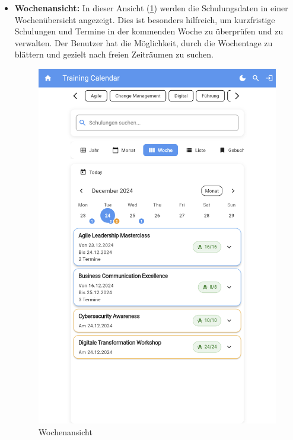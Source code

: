 \begin{itemize}
    \item \textbf{Wochenansicht:} In dieser Ansicht (\ref{Woche}) werden die Schulungsdaten in einer Wochenübersicht angezeigt. Dies ist besonders hilfreich, um kurzfristige Schulungen und Termine in der kommenden Woche zu überprüfen und zu verwalten. Der Benutzer hat die Möglichkeit, durch die Wochentage zu blättern und gezielt nach freien Zeiträumen zu suchen.
    \begin{figure}[htbp!]
        \centering
        \includegraphics[scale=0.2]{img/flutter_08.png}
        \caption{Wochenansicht}
        \label{Woche}
    \end{figure}


\end{itemize}
